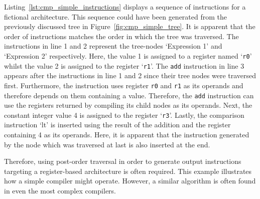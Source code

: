 
Listing~\ref{lst:cmp_simple_instructions} displays a sequence of instructions for a fictional architecture.
This sequence could have been generated from the previously discussed tree in Figure~\ref{fig:cmp_simple_tree}.
It is apparent that the order of instructions matches the order in which the tree was traversed.
The instructions in line 1 and 2 represent the tree-nodes `Expression 1' and `Expression 2' respectively.
Here, the value 1 is assigned to a register named `\texttt{r0}' whilst the value 2 is assigned to the register `\texttt{r1}'.
The \texttt{add} instruction in line 3 appears after the instructions in line 1 and 2 since their tree nodes were traversed first.
Furthermore, the instruction uses register \texttt{r0} and \texttt{r1} as its operands and therefore depends on them containing a value.
Therefore, the \texttt{add} instruction can use the registers returned by compiling its child nodes as its operands.
Next, the constant integer value 4 is assigned to the register `\texttt{r3}'.
Lastly, the comparison instruction `lt' is inserted using the result of the addition and the register containing 4 as its operands.
Here, it is apparent that the instruction generated by the node which was traversed at last is also inserted at the end.

Therefore, using post-order traversal in order to generate output instructions targeting a register-based architecture is often required.
This example illustrates how a simple compiler might operate.
However, a similar algorithm is often found in even the most complex compilers.

